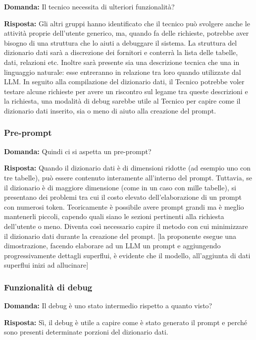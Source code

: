 \textbf{Domanda:} Il tecnico necessita di ulteriori funzionalità?

\textbf{Risposta:} Gli altri gruppi hanno identificato che il tecnico può svolgere anche le attività proprie dell’utente generico, ma, quando fa delle richieste, potrebbe aver bisogno di una struttura che lo aiuti a debuggare il sistema.
La struttura del dizionario dati sarà a discrezione dei fornitori e conterrà la lista delle tabelle, dati, relazioni etc. Inoltre sarà presente sia una descrizione tecnica che una in linguaggio naturale: esse entreranno in relazione tra loro quando utilizzate dal LLM. In seguito alla compilazione del dizionario dati, il Tecnico potrebbe voler testare alcune richieste per avere un riscontro sul legame tra queste descrizioni e la richiesta, una modalità di debug sarebbe utile al Tecnico per capire come il dizionario dati inserito, sia o meno di aiuto alla creazione del prompt.


\subsubsection{Pre-prompt}

\textbf{Domanda:} Quindi ci si aspetta un pre-prompt?

\textbf{Risposta:} Quando il dizionario dati è di dimensioni ridotte (ad esempio uno con tre tabelle), può essere contenuto interamente all’interno del prompt. Tuttavia, se il dizionario è di maggiore dimensione (come in un caso con mille tabelle), si presentano dei problemi tra cui il costo elevato dell’elaborazione di un prompt con numerosi token. Teoricamente è possibile avere prompt grandi ma è meglio mantenerli piccoli, capendo quali siano le sezioni pertinenti alla richiesta dell’utente o meno. Diventa così necessario capire il metodo con cui minimizzare il dizionario dati durante la creazione del prompt.
[la proponente esegue una dimostrazione, facendo elaborare ad un LLM un prompt e aggiungendo progressivamente dettagli superflui, è evidente che il modello, all’aggiunta di dati superflui inizi ad allucinare]

\subsubsection{Funzionalità di debug}

\textbf{Domanda:} Il debug è uno stato intermedio rispetto a quanto visto?

\textbf{Risposta:} Sì, il debug è utile a capire come è stato generato il prompt e perché sono presenti determinate porzioni del dizionario dati.


